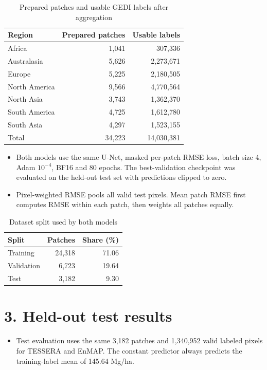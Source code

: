\documentclass[11pt]{article}
\begin{document}
\begin{table}[H]
	\centering
	\caption{Prepared patches and usable GEDI labels after aggregation}
	\small
	\begin{tabular}{@{}lrr@{}}
		\toprule
		Region        & Prepared patches & Usable labels \\
		\midrule
		Africa        & 1,041            & 307,336       \\
		Australasia   & 5,626            & 2,273,671     \\
		Europe        & 5,225            & 2,180,505     \\
		North America & 9,566            & 4,770,564     \\
		North Asia    & 3,743            & 1,362,370     \\
		South America & 4,725            & 1,612,780     \\
		South Asia    & 4,297            & 1,523,155     \\
		\midrule
		Total         & 34,223           & 14,030,381    \\
		\bottomrule
	\end{tabular}
\end{table}

\begin{itemize}
	\item Both models use the same U-Net, masked per-patch RMSE loss, batch size 4, Adam $10^{-4}$, BF16 and 80 epochs. The best-validation checkpoint was evaluated on the held-out test set with predictions clipped to zero.
	\item Pixel-weighted RMSE pools all valid test pixels. Mean patch RMSE first computes RMSE within each patch, then weights all patches equally.
\end{itemize}

\begin{table}[H]
	\centering
	\caption{Dataset split used by both models}
	\small
	\begin{tabular}{@{}lrr@{}}
		\toprule
		Split      & Patches & Share (\%) \\
		\midrule
		Training   & 24,318  & 71.06      \\
		Validation & 6,723   & 19.64      \\
		Test       & 3,182   & 9.30       \\
		\bottomrule
	\end{tabular}
\end{table}

\section*{3. Held-out test results}
\begin{itemize}
	\item Test evaluation uses the same 3,182 patches and 1,340,952 valid labeled pixels for TESSERA and EnMAP. The constant predictor always predicts the training-label mean of 145.64 Mg/ha.
\end{itemize}
\end{document}
